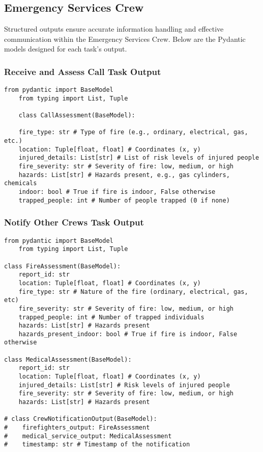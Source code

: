 \subsection{Emergency Services Crew}

Structured outputs ensure accurate information handling and effective communication within the Emergency Services Crew. Below 
are the Pydantic models designed for each task's output.

\subsubsection{Receive and Assess Call Task Output}

\begin{lstlisting}[caption={Pydantic model for Receive and Assess Call Task Output}] 
    from pydantic import BaseModel
    from typing import List, Tuple

    class CallAssessment(BaseModel): 

    fire_type: str # Type of fire (e.g., ordinary, electrical, gas, etc.) 
    location: Tuple[float, float] # Coordinates (x, y) 
    injured_details: List[str] # List of risk levels of injured people 
    fire_severity: str # Severity of fire: low, medium, or high 
    hazards: List[str] # Hazards present, e.g., gas cylinders, chemicals 
    indoor: bool # True if fire is indoor, False otherwise 
    trapped_people: int # Number of people trapped (0 if none) \end{lstlisting}

\subsubsection{Notify Other Crews Task Output}

\begin{lstlisting}[caption={Pydantic model for Notify Other Crews Task Output}] 
    from pydantic import BaseModel 
    from typing import List, Tuple

class FireAssessment(BaseModel): 
    report_id: str
    location: Tuple[float, float] # Coordinates (x, y) 
    fire_type: str # Nature of the fire (ordinary, electrical, gas, etc)
    fire_severity: str # Severity of fire: low, medium, or high
    trapped_people: int # Number of trapped individuals 
    hazards: List[str] # Hazards present
    hazards_present_indoor: bool # True if fire is indoor, False otherwise

class MedicalAssessment(BaseModel): 
    report_id: str
    location: Tuple[float, float] # Coordinates (x, y) 
    injured_details: List[str] # Risk levels of injured people 
    fire_severity: str # Severity of fire: low, medium, or high 
    hazards: List[str] # Hazards present

# class CrewNotificationOutput(BaseModel): 
#    firefighters_output: FireAssessment
#    medical_service_output: MedicalAssessment
#    timestamp: str # Timestamp of the notification 

\end{lstlisting}

